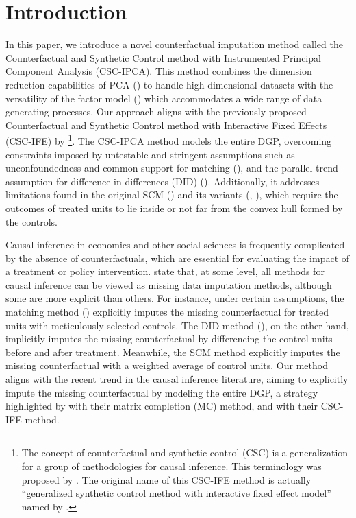 \documentclass[12pt]{article}
\begin{document}
\doublespacing

\section{Introduction} 
\label{sec:introduction}
In this paper, we introduce a novel counterfactual imputation method called the Counterfactual and Synthetic Control method with Instrumented Principal Component Analysis (CSC-IPCA). This method combines the dimension reduction capabilities of PCA (\cite{jollife2016principal}) to handle high-dimensional datasets with the versatility of the factor model (\cite{bai2003computation,bai2009panel}) which accommodates a wide range of data generating processes. Our approach aligns with the previously proposed Counterfactual and Synthetic Control method with Interactive Fixed Effects (CSC-IFE) by \cite{xu2017generalized}\footnote{The concept of counterfactual and synthetic control (CSC) is a generalization for a group of methodologies for causal inference. This terminology was proposed by \cite{chernozhukov2021exact}. The original name of this CSC-IFE method is actually ``generalized synthetic control method with interactive fixed effect model'' named by \cite{xu2017generalized}.}. The CSC-IPCA method models the entire DGP, overcoming constraints imposed by untestable and stringent assumptions such as unconfoundedness and common support for matching (\cite{rosenbaum1983central, rubin1997estimating}), and the parallel trend assumption for difference-in-differences (DID) (\cite{card1993minimum}). Additionally, it addresses limitations found in the original SCM (\cite{abadie2010synthetic}) and its variants (\cite{ben2021augmented}, \cite{arkhangelsky2021synthetic}), which require the outcomes of treated units to lie inside or not far from the convex hull formed by the controls.

Causal inference in economics and other social sciences is frequently complicated by the absence of counterfactuals, which are essential for evaluating the impact of a treatment or policy intervention. \cite{imbens2015causal} state that, at some level, all methods for causal inference can be viewed as missing data imputation methods, although some are more explicit than others. For instance, under certain assumptions, the matching method (\cite{abadie2006large, abadie2011bias}) explicitly imputes the missing counterfactual for treated units with meticulously selected controls. The DID method (\cite{card1993minimum, ashenfelter1978estimating}), on the other hand, implicitly imputes the missing counterfactual by differencing the control units before and after treatment. Meanwhile, the SCM method explicitly imputes the missing counterfactual with a weighted average of control units. Our method aligns with the recent trend in the causal inference literature, aiming to explicitly impute the missing counterfactual by modeling the entire DGP, a strategy highlighted by \cite{athey2021matrix} with their matrix completion (MC) method, and \cite{xu2017generalized} with their CSC-IFE method.
\end{document}
